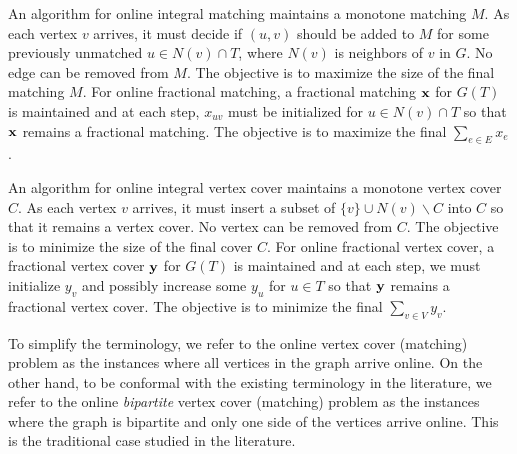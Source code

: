 \documentclass{article}
\newcommand{\bx}{{\bf{x}}}
\newcommand{\by}{{\bf{y}}}
\begin{document}

An algorithm for online integral matching maintains a monotone matching $M$. As each vertex $v$ arrives, it must decide if $(u,v)$ should be added to $M$ for some previously unmatched $u\in N(v)\cap T$, where $N(v)$ is neighbors of $v$ in $G$. No edge can be removed from $M$. The objective is to maximize the size of the final matching $M$. For online fractional matching, a fractional matching $\bx$ for $G(T)$ is maintained and at each step, $x_{uv}$ must be initialized for $u\in N(v)\cap T$ so that $\bx$ remains a fractional matching. The objective is to maximize the final $\sum_{e\in E} x_e$.

An algorithm for online integral vertex cover maintains a monotone vertex cover $C$. As each vertex $v$ arrives, it must insert a subset of $\{v\}\cup N(v)\backslash C$ into $C$ so that it remains a vertex cover. No vertex can be removed from $C$. The objective is to minimize the size of the final cover $C$. For online fractional vertex cover, a fractional vertex cover $\by$ for $G(T)$ is maintained and at each step, we must initialize $y_v$ and possibly increase some $y_u$ for $u\in T$ so that $\by$ remains a fractional vertex cover. The objective is to minimize the final $\sum_{v\in V}y_v$.

To simplify the terminology, we refer to the online vertex cover (matching) problem as the instances where all vertices in the graph arrive online. On the other hand, to be conformal with the existing terminology in the literature, we refer to the online {\em bipartite} vertex cover (matching) problem as the instances where the graph is bipartite and only one side of the vertices arrive online. This is the traditional case studied in the literature.
\end{document}
